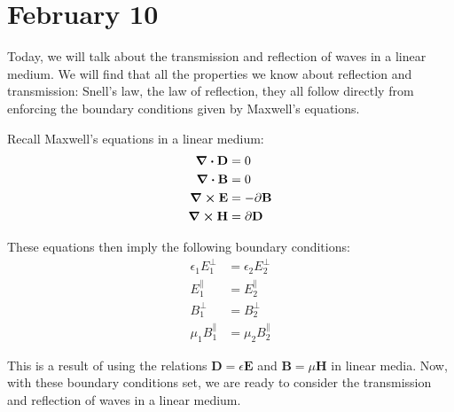 \section{February 10}
Today, we will talk about the transmission and reflection of waves in a linear medium. We will find that all
the properties we know about reflection and transmission: Snell's law, the law of reflection, they all
follow directly from enforcing the boundary conditions given by Maxwell's equations. 

Recall Maxwell's equations in a linear medium:
\begin{align*}
	\div \mathbf{D} &=  0 \\ 
	\div \mathbf{B} &= 0 \\ 
	\curl \mathbf{E} &= -\partial \mathbf{B} \\ 
	\curl \mathbf{H} &= \partial \mathbf{D} 
\end{align*}

These equations then imply the following boundary conditions:
\begin{align}
	\epsilon_1 E_1^{\perp} &= \epsilon_2 E_2^{\perp}\label{a} \\ 
	E_1^{\parallel} &= E_2^{\parallel}\label{b} \\ 
	B_1^{\perp} &= B_2^{\perp} \label{c} \\ 
	\mu_1 B_1^{\parallel} &= \mu_2 B_2^{\parallel} \label{d}
\end{align}

This is a result of using the relations \( \mathbf{D} = \epsilon \mathbf{E} \) and \( \mathbf{B} = \mu \mathbf{H} \)
in linear media. Now, with these boundary conditions set, we are ready to consider the transmission and
reflection of waves in a linear medium.  

